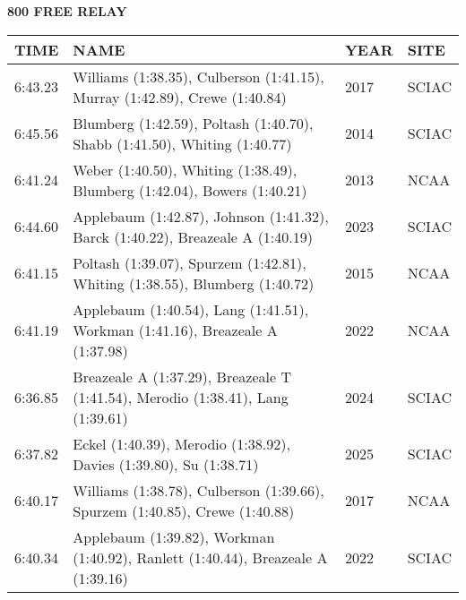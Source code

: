 \begin{center}
\begin{minipage}[t]{0.7\textwidth}
\centering
\textbf{800 FREE RELAY}\\[0.05cm]
\begin{tabular}{@{}p{1.8cm}p{2.8cm}p{1.2cm}p{1.4cm}@{}}
\hline
\textbf{TIME} & \textbf{NAME} & \textbf{YEAR} & \textbf{SITE} \\
\hline
6:43.23 & Williams (1:38.35), Culberson (1:41.15), Murray (1:42.89), Crewe (1:40.84) & 2017 & SCIAC \\
6:45.56 & Blumberg (1:42.59), Poltash (1:40.70), Shabb (1:41.50), Whiting (1:40.77) & 2014 & SCIAC \\
6:41.24 & Weber (1:40.50), Whiting (1:38.49), Blumberg (1:42.04), Bowers (1:40.21) & 2013 & NCAA \\
6:44.60 & Applebaum (1:42.87), Johnson (1:41.32), Barck (1:40.22), Breazeale A (1:40.19) & 2023 & SCIAC \\
6:41.15 & Poltash (1:39.07), Spurzem (1:42.81), Whiting (1:38.55), Blumberg (1:40.72) & 2015 & NCAA \\
6:41.19 & Applebaum (1:40.54), Lang (1:41.51), Workman (1:41.16), Breazeale A (1:37.98) & 2022 & NCAA \\
6:36.85 & Breazeale A (1:37.29), Breazeale T (1:41.54), Merodio (1:38.41), Lang (1:39.61) & 2024 & SCIAC \\
6:37.82 & Eckel (1:40.39), Merodio (1:38.92), Davies (1:39.80), Su (1:38.71) & 2025 & SCIAC \\
6:40.17 & Williams (1:38.78), Culberson (1:39.66), Spurzem (1:40.85), Crewe (1:40.88) & 2017 & NCAA \\
6:40.34 & Applebaum (1:39.82), Workman (1:40.92), Ranlett (1:40.44), Breazeale A (1:39.16) & 2022 & SCIAC \\
\hline
\end{tabular}
\end{minipage}
\end{center}

\vspace{0.4cm}

